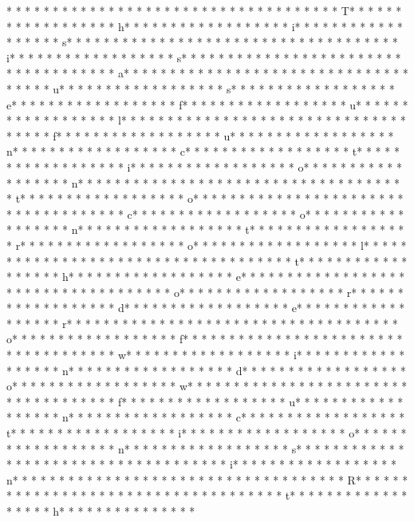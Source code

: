 * * *  * * *  * * *  *  * * *  *  * * *  * 
* * *  * * *  * * *  *  * * *  *  * * *  * T* * *  * * *  * * *  *  * * *  *  * * *  * h* * *  * * *  * * *  *  * * *  *  * * *  * i* * *  * * *  * * *  *  * * *  *  * * *  * s* * *  * * *  * * *  *  * * *  *  * * *  *  * * *  * * *  * * *  *  * * *  *  * * *  * i* * *  * * *  * * *  *  * * *  *  * * *  * s* * *  * * *  * * *  *  * * *  *  * * *  *  * * *  * * *  * * *  *  * * *  *  * * *  * a* * *  * * *  * * *  *  * * *  *  * * *  *  * * *  * * *  * * *  *  * * *  *  * * *  * u* * *  * * *  * * *  *  * * *  *  * * *  * s* * *  * * *  * * *  *  * * *  *  * * *  * e* * *  * * *  * * *  *  * * *  *  * * *  * f* * *  * * *  * * *  *  * * *  *  * * *  * u* * *  * * *  * * *  *  * * *  *  * * *  * l* * *  * * *  * * *  *  * * *  *  * * *  *  * * *  * * *  * * *  *  * * *  *  * * *  * f* * *  * * *  * * *  *  * * *  *  * * *  * u* * *  * * *  * * *  *  * * *  *  * * *  * n* * *  * * *  * * *  *  * * *  *  * * *  * c* * *  * * *  * * *  *  * * *  *  * * *  * t* * *  * * *  * * *  *  * * *  *  * * *  * i* * *  * * *  * * *  *  * * *  *  * * *  * o* * *  * * *  * * *  *  * * *  *  * * *  * n* * *  * * *  * * *  *  * * *  *  * * *  *  * * *  * * *  * * *  *  * * *  *  * * *  * t* * *  * * *  * * *  *  * * *  *  * * *  * o* * *  * * *  * * *  *  * * *  *  * * *  *  * * *  * * *  * * *  *  * * *  *  * * *  * c* * *  * * *  * * *  *  * * *  *  * * *  * o* * *  * * *  * * *  *  * * *  *  * * *  * n* * *  * * *  * * *  *  * * *  *  * * *  * t* * *  * * *  * * *  *  * * *  *  * * *  * r* * *  * * *  * * *  *  * * *  *  * * *  * o* * *  * * *  * * *  *  * * *  *  * * *  * l* * *  * * *  * * *  *  * * *  *  * * *  *  * * *  * * *  * * *  *  * * *  *  * * *  * t* * *  * * *  * * *  *  * * *  *  * * *  * h* * *  * * *  * * *  *  * * *  *  * * *  * e* * *  * * *  * * *  *  * * *  *  * * *  *  * * *  * * *  * * *  *  * * *  *  * * *  * o* * *  * * *  * * *  *  * * *  *  * * *  * r* * *  * * *  * * *  *  * * *  *  * * *  * d* * *  * * *  * * *  *  * * *  *  * * *  * e* * *  * * *  * * *  *  * * *  *  * * *  * r* * *  * * *  * * *  *  * * *  *  * * *  *  * * *  * * *  * * *  *  * * *  *  * * *  * o* * *  * * *  * * *  *  * * *  *  * * *  * f* * *  * * *  * * *  *  * * *  *  * * *  *  * * *  * * *  * * *  *  * * *  *  * * *  * w* * *  * * *  * * *  *  * * *  *  * * *  * i* * *  * * *  * * *  *  * * *  *  * * *  * n* * *  * * *  * * *  *  * * *  *  * * *  * d* * *  * * *  * * *  *  * * *  *  * * *  * o* * *  * * *  * * *  *  * * *  *  * * *  * w* * *  * * *  * * *  *  * * *  *  * * *  *  * * *  * * *  * * *  *  * * *  *  * * *  * f* * *  * * *  * * *  *  * * *  *  * * *  * u* * *  * * *  * * *  *  * * *  *  * * *  * n* * *  * * *  * * *  *  * * *  *  * * *  * c* * *  * * *  * * *  *  * * *  *  * * *  * t* * *  * * *  * * *  *  * * *  *  * * *  * i* * *  * * *  * * *  *  * * *  *  * * *  * o* * *  * * *  * * *  *  * * *  *  * * *  * n* * *  * * *  * * *  *  * * *  *  * * *  * s* * *  * * *  * * *  *  * * *  *  * * *  *  * * *  * * *  * * *  *  * * *  *  * * *  * i* * *  * * *  * * *  *  * * *  *  * * *  * n* * *  * * *  * * *  *  * * *  *  * * *  *  * * *  * * *  * * *  *  * * *  *  * * *  * R* * *  * * *  * * *  *  * * *  *  * * *  *  * * *  * * *  * * *  *  * * *  *  * * *  * t* * *  * * *  * * *  *  * * *  *  * * *  * h* * *  * * *  * * *  *  * * *  *  * 
